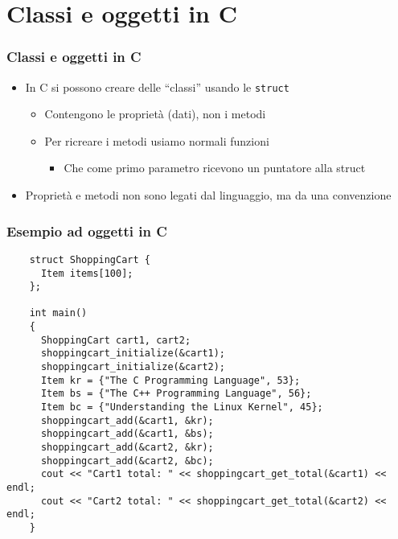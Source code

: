 \documentclass[xetex,table]{beamer}
\begin{document}
\section{Classi e oggetti in C}

\begin{frame}
  \frametitle{Classi e oggetti in C}
  \begin{itemize}
  \item In C si possono creare delle ``classi'' usando le \texttt{struct}
    \begin{itemize}
    \item Contengono le proprietà (dati), non i metodi
    \item Per ricreare i metodi usiamo normali funzioni
      \begin{itemize}
      \item Che come primo parametro ricevono un puntatore alla struct
      \end{itemize}
    \end{itemize}
    \item Proprietà e metodi non sono legati dal linguaggio, ma da una
      convenzione
  \end{itemize}
\end{frame}

\begin{frame}[fragile]
  \frametitle{Esempio ad oggetti in C}
  \begin{verbatim}
    struct ShoppingCart {
      Item items[100];
    };

    int main()
    {
      ShoppingCart cart1, cart2;
      shoppingcart_initialize(&cart1);
      shoppingcart_initialize(&cart2);
      Item kr = {"The C Programming Language", 53};
      Item bs = {"The C++ Programming Language", 56};
      Item bc = {"Understanding the Linux Kernel", 45};
      shoppingcart_add(&cart1, &kr);
      shoppingcart_add(&cart1, &bs);
      shoppingcart_add(&cart2, &kr);
      shoppingcart_add(&cart2, &bc);
      cout << "Cart1 total: " << shoppingcart_get_total(&cart1) << endl;
      cout << "Cart2 total: " << shoppingcart_get_total(&cart2) << endl;
    }
  \end{verbatim}
\end{frame}
\end{document}
